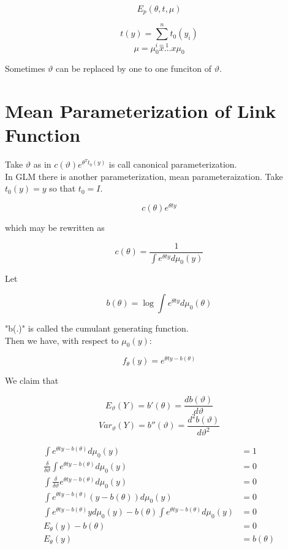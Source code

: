 \documentclass[11pt,fleqn]{book} %
\begin{document}
		$$E_p(\theta, t, \mu) $$

		$$t(y) =  \sum^n_{i=1} t_0(y_i)$$
		$$\mu = \mu_0 x \dots x\mu_0$$


Sometimes $\vartheta$ can be replaced by one to one funciton of $\vartheta$. 

\section{Mean Parameterization of Link Function}

Take $\vartheta$ as in $c(\vartheta) e^{\theta^T t_0(y)}$ is call canonical parameterization. \\

In GLM there is another parameterization, mean parameteraization. Take $t_0(y) = y$ so that $t_0 = I$. 

			$$c(\theta)e^{\theta ty}$$

which may be rewritten as

		$$c(\theta) = \frac{1}{\int e^{\theta ty} d\mu_0(y) }  $$


Let 

	$$b(\theta) = \log \int e^{\theta ty} d\mu_0(\theta) $$

"b(.)" is called the cumulant generating function.\\

Then we have, with respect to $\mu_0(y)$:

		$$f_\theta(y) = e^{\theta ty - b(\theta)} $$

We claim that 

		$$E_\vartheta(Y) = b'(\theta) = \frac{d b(\vartheta)}{d\vartheta} $$
		$$Var_\vartheta(Y) = b''(\vartheta) = \frac{d^2 b(\vartheta)}{d\vartheta^2}$$

		\begin{align*}
			\int  e^{\theta ty - b(\theta)} d\mu_0(y) &= 1\\
			\frac{\delta}{\delta\vartheta}\int  e^{\theta ty - b(\theta)} d\mu_0(y) &= 0\\
			\int \frac{\delta}{\delta\vartheta} e^{\theta ty - b(\theta)} d\mu_0(y) &= 0\\
			\int  e^{\theta ty - b(\theta)} (y - b(\theta)) d\mu_0(y) &= 0\\
			\int  e^{\theta ty - b(\theta)} y d\mu_0(y) - b(\theta) \int  e^{\theta ty - b(\theta)} d\mu_0(y) &=0\\
			E_\theta(y) - b(\theta) &= 0\\
			E_\theta(y) &= b(\theta)
		\end{align*}
\end{document}

